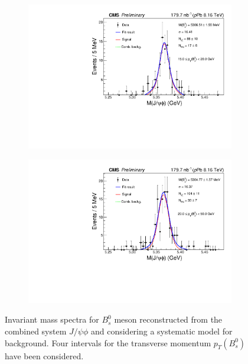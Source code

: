 \begin{figure}[htp!]
\begin{subfigure}[b]{0.475\textwidth}
		\includegraphics[width=\textwidth]{MainContent/Figs/mass/mass_BsFit_ptbins_sysbkg_15_20.PDF}
		\caption{}
	\end{subfigure}
	\hfill
	\begin{subfigure}[b]{0.475\textwidth}
		\centering
		\includegraphics[width=\textwidth]{MainContent/Figs/mass/mass_BsFit_ptbins_sysbkg_20_50.PDF}
		\caption{}%
	\end{subfigure}
	\caption{Invariant mass spectra for $B^0_s$ meson reconstructed from the combined system $J/\psi \phi$ and considering a systematic model for background. Four intervals for the transverse momentum $p_T(B^0_s)$ have been considered.}
	\label{fig:mass_ptbins_sysbkg}
	
\end{figure}



